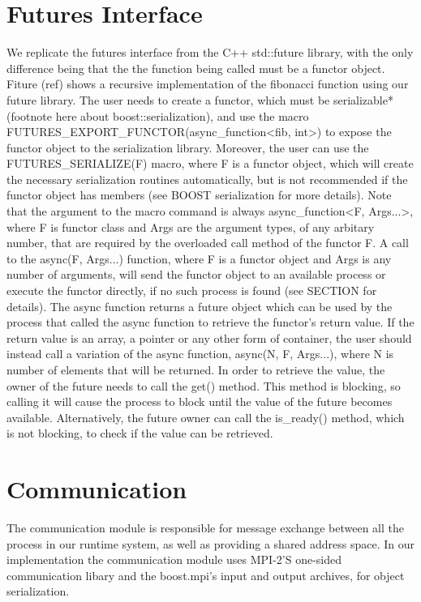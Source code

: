 \section{Futures Interface}
We replicate the futures interface from the C++ std::future library, with the only difference being that 
the the function being called must be a functor object.  Fiture (ref) shows a recursive implementation
of the fibonacci function using our future library.  The user needs to create a functor, which must be
serializable*(footnote here about boost::serialization), and use the macro 
FUTURES\_EXPORT\_FUNCTOR(async\_function<fib, int>) to expose the functor object to the serialization library.
Moreover, the user can use the FUTURES\_SERIALIZE(F) macro, where F is a functor object, 
which will create the necessary serialization routines automatically, but is not recommended if the 
functor object has members (see BOOST serialization for more details).
Note that the argument to the macro command is always async\_function<F, Args...>, where F is functor class
and Args are the argument types, of any arbitary number, that are required by the overloaded call method 
of the functor F.  A call to the async(F, Args...) function, where F is a functor object and Args is any number of 
arguments,
will send the functor object to an available process or execute 
the functor directly, if no such process is found (see SECTION for details). The async function returns a 
future object which can be used by the process that called the async function to retrieve the 
functor's return value.  If the return value is an array, a pointer or any other form of container, the user
should instead call a variation of the async function, async(N, F, Args...), where N is number of elements
that will be returned. In order to retrieve the value,
the owner of the future needs to call the get() method.  This method is blocking, so calling it will cause the 
process to block until the value of the future becomes available.  Alternatively, the future owner can call the
is\_ready() method, which is not blocking, to check if the value can be retrieved. 

\section{Communication}
The communication module is responsible for message exchange between all the process in our runtime system,
as well as providing a shared address space.
In our implementation the communication module uses MPI-2'S one-sided communication libary and the boost.mpi's
input and output archives, for object serialization. 

